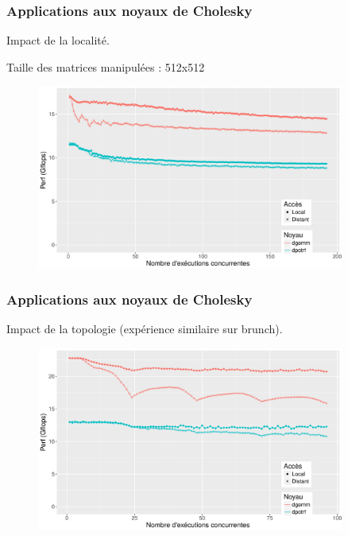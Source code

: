 \documentclass[xcolor={usenames,dvipsnames,svgnames,table}, aspectratio=43]{beamer}
\begin{document}
\begin{frame}
\frametitle{Applications aux noyaux de Cholesky}

Impact de la localité.

Taille des matrices manipulées : 512x512
\begin{figure}
  \centering
  \includegraphics[width=0.9\textwidth]{graph/kernel_512_remote_idchire.pdf}
\end{figure}


\end{frame}


\begin{frame}
\frametitle{Applications aux noyaux de Cholesky}

Impact de la topologie (expérience similaire sur brunch).

\begin{figure}
  \centering
  \includegraphics[width=0.9\textwidth]{graph/kernel_512_remote_brunch.pdf}
\end{figure}


\end{frame}
\end{document}
